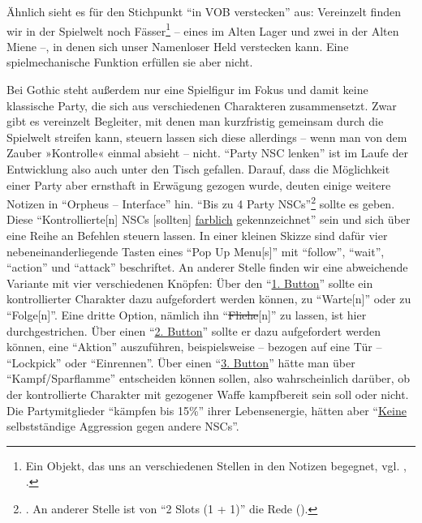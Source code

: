\documentclass[a5paper,pagesize]{scrbook}
\begin{document}
Ähnlich sieht es für den Stichpunkt \enquote{in VOB verstecken} aus:
Vereinzelt finden wir in der Spielwelt noch Fässer\footnote{Ein Objekt, das uns an verschiedenen Stellen in den Notizen begegnet, vgl. \autocite[S.~19]{orpheus_b_scribbles}, \autocite[S.~6]{orpheus_interface}.} -- eines im Alten Lager und zwei in der Alten Miene --, in denen sich unser Namenloser Held verstecken kann.
Eine spielmechanische Funktion erfüllen sie aber nicht.

Bei Gothic steht außerdem nur eine Spielfigur im Fokus und damit keine klassische Party, die sich aus verschiedenen Charakteren zusammensetzt.
Zwar gibt es vereinzelt Begleiter, mit denen man kurzfristig gemeinsam durch die Spielwelt streifen kann, steuern lassen sich diese allerdings -- wenn man von dem Zauber »Kontrolle« einmal absieht -- nicht. %
\enquote{Party NSC lenken} ist im Laufe der Entwicklung also auch unter den Tisch gefallen.
Darauf, dass die Möglichkeit einer Party aber ernsthaft in Erwägung gezogen wurde, deuten einige weitere Notizen in \enquote{Orpheus -- Interface} hin.
\enquote{Bis zu 4 Party NSCs}\footnote{\autocite[S.~5]{orpheus_interface}. An anderer Stelle ist von \enquote{2 Slots (1 + 1)} die Rede (\autocite[S.~7]{orpheus_b_scribbles}).} sollte es geben.
Diese \enquote{Kontrollierte[n] NSCs [sollten] \uline{farblich} gekennzeichnet}\autocite[S.~5]{orpheus_interface} sein und sich über eine Reihe an Befehlen steuern lassen.
In einer kleinen Skizze sind dafür vier nebeneinanderliegende Tasten eines \enquote{Pop Up Menu[s]} mit \enquote{follow}, \enquote{wait}, \enquote{action} und \enquote{attack} beschriftet.\autocite[S.~3]{orpheus_interface}
An anderer Stelle finden wir eine abweichende Variante mit vier verschiedenen Knöpfen:
Über den \enquote{\uline{1. Button}} sollte ein kontrollierter Charakter dazu aufgefordert werden können, zu \enquote{Warte[n]} oder zu \enquote{Folge[n]}.
Eine dritte Option, nämlich ihn \enquote{\sout{Fliehe}[n]} zu lassen, ist hier durchgestrichen.
Über einen \enquote{\uline{2. Button}} sollte er dazu aufgefordert werden können, eine \enquote{Aktion} auszuführen, beispielsweise -- bezogen auf eine Tür -- \enquote{Lockpick} oder \enquote{Einrennen}.
Über einen \enquote{\uline{3. Button}} hätte man über \enquote{Kampf/Sparflamme} entscheiden können sollen, also wahrscheinlich darüber, ob der kontrollierte Charakter mit gezogener Waffe kampfbereit sein soll oder nicht.
Die Partymitglieder \enquote{kämpfen bis 15\%} ihrer Lebensenergie, hätten aber \enquote{\uline{Keine} selbstständige Aggression gegen andere NSCs}.
\end{document}
